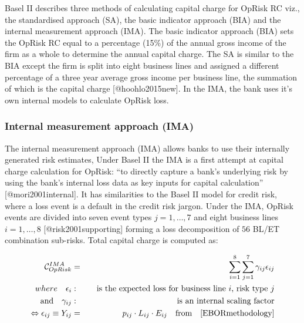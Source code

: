 \documentclass[
]{article}
\begin{document}
Basel II describes three methods of calculating capital charge for
OpRisk RC viz., the standardised approach (SA), the basic indicator
approach (BIA) and the internal measurement approach (IMA). The basic
indicator approach (BIA) sets the OpRisk RC equal to a percentage (15\%)
of the annual gross income of the firm as a whole to determine the
annual capital charge. The SA is similar to the BIA except the firm is
split into eight business lines and assigned a different percentage of a
three year average gross income per business line, the summation of
which is the capital charge {[}@hoohlo2015new{]}. In the IMA, the bank
uses it's own internal models to calculate OpRisk loss.

\subsubsection{Internal measurement approach (IMA)}
\label{sssec:Internal measurement approach}

The internal measurement approach (IMA) allows banks to use their
internally generated risk estimates, Under Basel II the IMA is a first
attempt at capital charge calculation for OpRisk: ``to directly capture
a bank's underlying risk by using the bank's internal loss data as key
inputs for capital calculation'' {[}@mori2001internal{]}. It has
similarities to the Basel II model for credit risk, where a loss event
is a default in the credit risk jargon. Under the IMA, OpRisk events are
divided into seven event types \(j=1,\ldots,7\) and eight business lines
\(i=1,\ldots,8\) {[}@risk2001supporting{]} forming a loss decomposition
of \(56\) BL/ET combination sub-risks. Total capital charge is computed
as:\medskip

\singlespacing

\begin{eqnarray}\label{Internalmeasurement}
\mathcal{\Large{C}}_{OpRisk}^{IMA} &=& \sum_{i=1}^8 \sum_{j=1}^7 \gamma_{ij}\epsilon_{ij} \\
where \quad \epsilon_{i}&:& \quad \mbox{is the expected loss for business line $i$, risk type $j$} \nonumber \\
    \mbox{and} \quad  \gamma_{ij}&:& \quad \mbox{is an internal scaling factor} \nonumber\\
\Leftrightarrow \epsilon_{ij} \equiv Y_{ij} &=& p_{ij} \cdot L_{ij} \cdot E_{ij} \quad \mbox{from}\quad \ref{EBORmethodology}\nonumber\\
\end{eqnarray} \doublespacing
\end{document}
